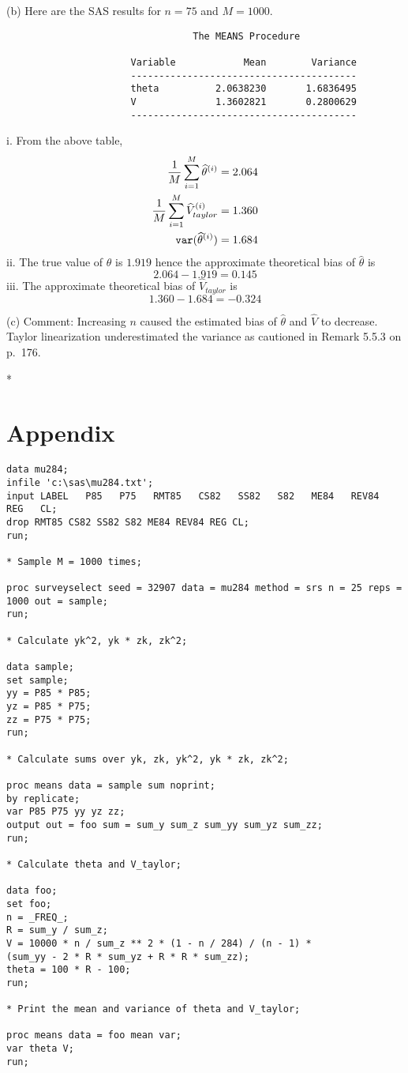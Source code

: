\documentclass[12pt]{article}
\begin{document}
(b) Here are the SAS results for $n=75$ and $M=1000$.
\begin{verbatim}
                                 The MEANS Procedure

                      Variable            Mean        Variance
                      ----------------------------------------
                      theta          2.0638230       1.6836495
                      V              1.3602821       0.2800629
                      ----------------------------------------
\end{verbatim}
i. From the above table,
\begin{align*}
{1\over M}\sum_{i=1}^M\widehat\theta^{(i)}&=2.064\\
{1\over M}\sum_{i=1}^M\widehat V_{taylor}^{(i)}&=1.360\\
{\tt var}(\widehat\theta^{(i)})&=1.684
\end{align*}
ii. The true value of $\theta$ is $1.919$ hence
the approximate theoretical bias of $\widehat\theta$ is
\[
2.064-1.919=0.145
\]
iii. The approximate theoretical bias of $\widehat V_{taylor}$ is
\[
1.360-1.684=-0.324
\]

(c) Comment:
Increasing $n$ caused the estimated
bias of $\widehat\theta$ and $\widehat V$ to decrease.
Taylor linearization underestimated the variance
as cautioned in Remark 5.5.3 on p.\ 176.

*\newpage

\section*{Appendix}

\begin{verbatim}
data mu284;
infile 'c:\sas\mu284.txt';
input LABEL   P85   P75   RMT85   CS82   SS82   S82   ME84   REV84   REG   CL;
drop RMT85 CS82 SS82 S82 ME84 REV84 REG CL;
run;

* Sample M = 1000 times;

proc surveyselect seed = 32907 data = mu284 method = srs n = 25 reps = 1000 out = sample;
run;

* Calculate yk^2, yk * zk, zk^2;

data sample;
set sample;
yy = P85 * P85;
yz = P85 * P75;
zz = P75 * P75;
run;

* Calculate sums over yk, zk, yk^2, yk * zk, zk^2;

proc means data = sample sum noprint;
by replicate;
var P85 P75 yy yz zz;
output out = foo sum = sum_y sum_z sum_yy sum_yz sum_zz;
run;

* Calculate theta and V_taylor;

data foo;
set foo;
n = _FREQ_;
R = sum_y / sum_z;
V = 10000 * n / sum_z ** 2 * (1 - n / 284) / (n - 1) *
(sum_yy - 2 * R * sum_yz + R * R * sum_zz);
theta = 100 * R - 100;
run;

* Print the mean and variance of theta and V_taylor;

proc means data = foo mean var;
var theta V;
run;
\end{verbatim}
\end{document}
